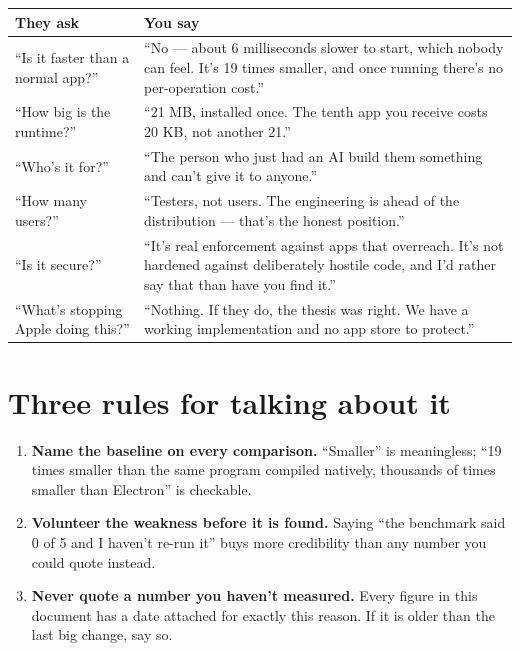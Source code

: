\documentclass[11pt,a4paper]{report}
\begin{document}
\begin{center}
\begin{longtable}{p{5.4cm}p{7.6cm}}
\toprule
\textbf{They ask} & \textbf{You say} \\
\midrule
\endhead
``Is it faster than a normal app?'' & ``No --- about 6 milliseconds slower
  to start, which nobody can feel. It's 19 times smaller, and once running
  there's no per-operation cost.'' \\
``How big is the runtime?'' & ``21 MB, installed once. The tenth app you
  receive costs 20 KB, not another 21.'' \\
``Who's it for?'' & ``The person who just had an AI build them something
  and can't give it to anyone.'' \\
``How many users?'' & ``Testers, not users. The engineering is ahead of the
  distribution --- that's the honest position.'' \\
``Is it secure?'' & ``It's real enforcement against apps that overreach.
  It's not hardened against deliberately hostile code, and I'd rather say
  that than have you find it.'' \\
``What's stopping Apple doing this?'' & ``Nothing. If they do, the thesis
  was right. We have a working implementation and no app store to
  protect.'' \\
\bottomrule
\end{longtable}
\end{center}

\section{Three rules for talking about it}

\begin{enumerate}[leftmargin=*]
  \item \textbf{Name the baseline on every comparison.} ``Smaller'' is
    meaningless; ``19 times smaller than the same program compiled
    natively, thousands of times smaller than Electron'' is checkable.
  \item \textbf{Volunteer the weakness before it is found.} Saying ``the
    benchmark said 0 of 5 and I haven't re-run it'' buys more credibility
    than any number you could quote instead.
  \item \textbf{Never quote a number you haven't measured.} Every figure in
    this document has a date attached for exactly this reason. If it is
    older than the last big change, say so.
\end{enumerate}
\end{document}
